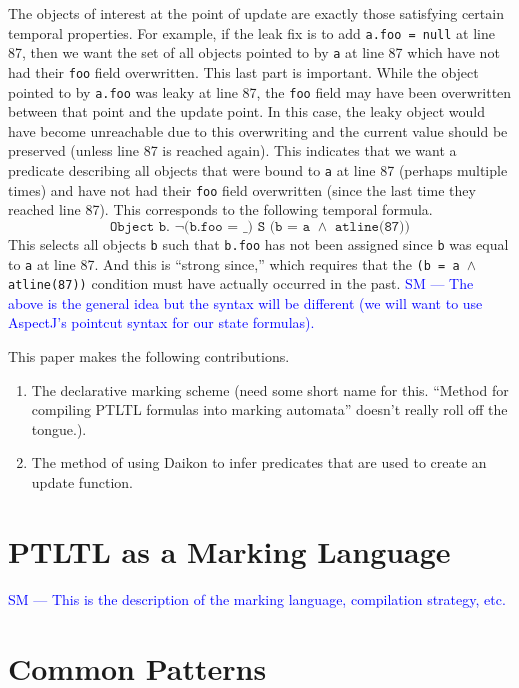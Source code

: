 \documentclass[natbib,preprint]{sigplanconf}
\newcommand{\stephencomment}[1]{\textcolor{blue}{SM --- #1}}
\begin{document}
The objects of interest at the point of update are exactly those satisfying certain temporal properties.  For example, if the leak fix is to add \texttt{a.foo = null} at line 87, then we want the set of all objects pointed to by \texttt{a} at line 87 which have not had their \texttt{foo} field overwritten.  This last part is important.  While the object pointed to by \texttt{a.foo} was leaky at line 87, the \texttt{foo} field may have been overwritten between that point and the update point.  In this case, the leaky object would have become unreachable due to this overwriting and the current value should be preserved (unless line 87 is reached again).  This indicates that we want a predicate describing all objects that were bound to \texttt{a} at line 87 (perhaps multiple times) and have not had their \texttt{foo} field overwritten (since the last time they reached line 87).  This corresponds to the following temporal formula.
\[\texttt{Object b. $\neg$(b.foo = \_) S (b = a $\wedge$ atline(87))}\]
This selects all objects \texttt{b} such that \texttt{b.foo} has not been assigned since \texttt{b} was equal to \texttt{a} at line 87.  And this is ``strong since,'' which requires that the \texttt{(b = a $\wedge$ atline(87))} condition must have actually occurred in the past.
\stephencomment{The above is the general idea but the syntax will be different (we will want to use AspectJ's pointcut syntax for our state formulas).}

This paper makes the following contributions.
\begin{enumerate}
\item The declarative marking scheme (need some short name for this.  ``Method for compiling PTLTL formulas into marking automata'' doesn't really roll off the tongue.).
\item The method of using Daikon to infer predicates that are used to create an update function.
\end{enumerate}

\section{PTLTL as a Marking Language}

\stephencomment{This is the description of the marking language, compilation strategy, etc.}

\section{Common Patterns}
\end{document}
